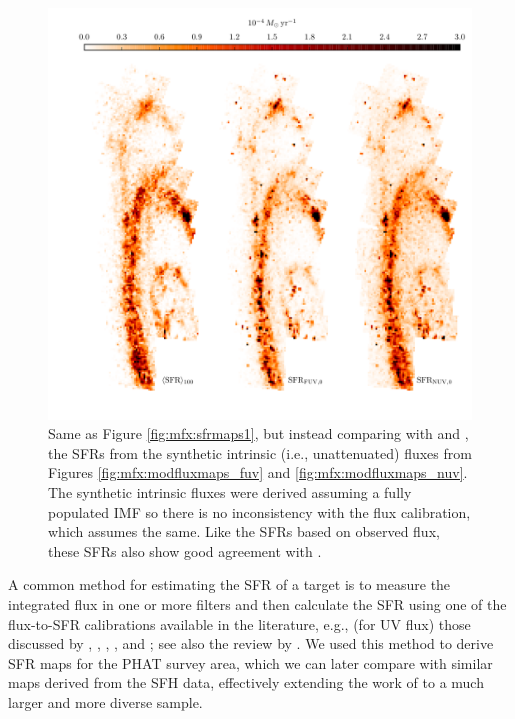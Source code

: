 \documentclass[iop, tighten]{emulateapj}
\begin{document}
\begin{figure}
\centering
\includegraphics[width=\textwidth]{m31flux-figures/sfrmaps2.pdf}
\caption[SFR maps from estimates based on synthetic intrinsic fluxes compared
    with the mean SFR map from the SFHs.]{Same as Figure
    \ref{fig:mfx:sfrmaps1}, but instead comparing \sfroneh{} with \sfrfuvz{}
    and \sfrnuvz{}, the SFRs from the synthetic intrinsic (i.e., unattenuated)
    fluxes from Figures \ref{fig:mfx:modfluxmaps_fuv} and
    \ref{fig:mfx:modfluxmaps_nuv}. The synthetic intrinsic fluxes were derived
    assuming a fully populated IMF so there is no inconsistency with the flux
    calibration, which assumes the same. Like the SFRs based on observed flux,
    these SFRs also show good agreement with \sfroneh{}.
}
\label{fig:mfx:sfrmaps2}
\end{figure}


A common method for estimating the SFR of a target is to measure the integrated
flux in one or more filters and then calculate the SFR using one of the
flux-to-SFR calibrations available in the literature, e.g., (for UV flux) those
discussed by \citet{Kennicutt:1998}, \citet{Salim:2007}, \citet{Hao:2011},
\citet{Murphy:2011}, and \citet{Leroy:2012}; see also the review by
\citet{Kennicutt:2012}. We used this method to derive SFR maps for the PHAT
survey area, which we can later compare with similar maps derived from the
\citet{Lewis:2014} SFH data, effectively extending the work of
\citet{Simones:2014} to a much larger and more diverse sample.
\end{document}
